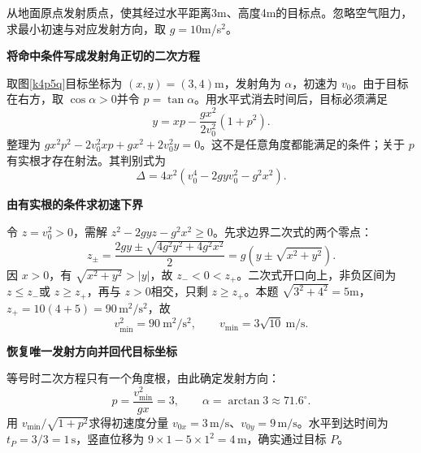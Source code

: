 \begin{question}\begin{example}[打到高处目标的最小初速]\label{k4p5}
从地面原点发射质点，使其经过水平距离3m、高度4m的目标点。忽略空气阻力，求最小初速与对应发射方向，取 $g=10$m/s$^2$。\end{example}
\end{question}
\begin{solution}\textbf{将命中条件写成发射角正切的二次方程}\par\nobreak
取图\ref{k4p5q}目标坐标为 $(x,y)=(3,4)$m，发射角为 $\alpha$，初速为 $v_0$。由于目标在右方，取 $\cos\alpha>0$并令 $p=\tan\alpha$。用水平式消去时间后，目标必须满足
\[y=xp-\frac{gx^2}{2v_0^2}(1+p^2).
\]
整理为 $gx^2p^2-2v_0^2xp+gx^2+2v_0^2y=0$。这不是任意角度都能满足的条件；关于 $p$有实根才存在射法。其判别式为
\[\Delta=4x^2(v_0^4-2gyv_0^2-g^2x^2).
\]



\par\medskip{}\noindent\textbf{由有实根的条件求初速下界}\par\nobreak
令 $z=v_0^2>0$，需解 $z^2-2gyz-g^2x^2\ge0$。先求边界二次式的两个零点：
\[
 z_{\pm}=\frac{2gy\pm\sqrt{4g^2y^2+4g^2x^2}}{2}
 =g\left(y\pm\sqrt{x^2+y^2}\right).
\]
因 $x>0$，有 $\sqrt{x^2+y^2}>|y|$，故 $z_-<0<z_+$。二次式开口向上，非负区间为 $z\le z_-$或 $z\ge z_+$，再与 $z>0$相交，只剩 $z\ge z_+$。本题 $\sqrt{3^2+4^2}=5$m，$z_+=10(4+5)=90\,\mathrm{m^2/s^2}$，故
\[\boxed{v_{\min}^2=90\ \mathrm{m^2/s^2}},\qquad
\boxed{v_{\min}=3\sqrt{10}\ \mathrm{m/s}}.
\]


\par\medskip{}\noindent\textbf{恢复唯一发射方向并回代目标坐标}\par\nobreak
等号时二次方程只有一个角度根，由此确定发射方向：
\[p=\frac{v_{\min}^2}{gx}=3,\qquad \boxed{\alpha=\arctan3\approx71.6^\circ}.\]
用 $v_{\min}/\sqrt{1+p^2}$求得初速度分量 $v_{0x}=3\,\mathrm{m/s}$、$v_{0y}=9\,\mathrm{m/s}$。水平到达时间为 $t_P=3/3=1\,\mathrm s$，竖直位移为 $9\times1-5\times1^2=4\,\mathrm m$，确实通过目标 $P$。




\end{solution}

